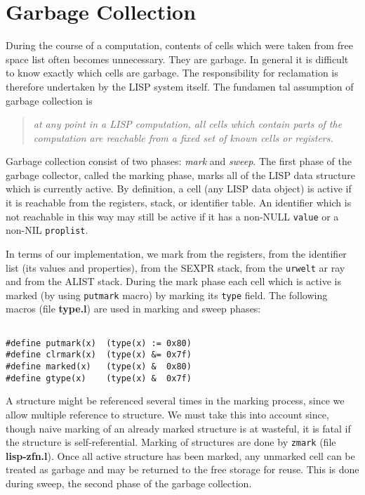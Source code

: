 \section{Garbage Collection}
During the course of a computation, contents of cells which were taken
from free space list often becomes unnecessary. They are garbage. In general
it is difficult to know exactly which cells are garbage.  The responsibility
for reclamation is therefore undertaken by the LISP system itself. The fundamen
tal assumption
of garbage collection is
\begin{quote}
 \em at any point in a LISP computation, all cells
which contain parts of the computation are reachable from a fixed set of
known cells or registers.
\end{quote}
Garbage collection consist of two phases: {\em mark} and {\em sweep}.
The first phase of the garbage collector, called the marking phase, marks
all of the LISP data structure which is currently active. By definition,
a cell (any LISP data object)  is  active  if  it  is  reachable  from  the
registers,  stack,  or  identifier  table.  An  identifier  which  is   not
reachable  in this way may still be active if it has a non-NULL {\tt value}
or a non-NIL {\tt proplist}.

In terms of our implementation, we mark from the registers, from the identifier
list (its values and properties), from the SEXPR stack, from the {\tt urwelt} ar
ray
and from the ALIST stack. During the mark phase each cell which is active is
marked (by using {\tt putmark} macro) by marking its {\tt type} field.
The following macros (file {\bf type.l}) are used in marking and sweep phases:
\begin{verbatim}

#define putmark(x)  (type(x) := 0x80)
#define clrmark(x)  (type(x) &= 0x7f)
#define marked(x)   (type(x) &  0x80)
#define gtype(x)    (type(x) &  0x7f)

\end{verbatim}

A structure might be referenced several times in the marking process, since
we allow multiple reference to structure. We must take
this into account since, though naive marking of an already marked structure
is at wasteful, it is fatal if the structure is self-referential.
Marking of structures are done by {\tt zmark} (file {\bf lisp-zfn.l}).
Once all active structure has been marked, any unmarked cell can be treated
as garbage and may be returned to the free storage for reuse. This is done
during sweep, the second phase of the garbage collection.

